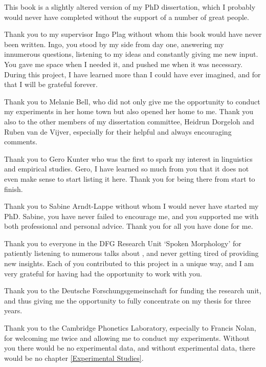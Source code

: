 \addchap{\lsAcknowledgementTitle} 

\vspace*{-0.4cm}
This book is a slightly altered version of my PhD dissertation, which I probably would never have completed without the support of a number of great people.

Thank you to my supervisor Ingo Plag without whom this book would have never been written. Ingo, you stood by my side from day one, answering my innumerous questions,  listening to my ideas and constantly giving me new input. You gave me space when I needed it, and pushed me when it was necessary. During this project, I have learned more than I could have ever imagined, and for that I will be grateful forever.

Thank you to Melanie Bell, who did not only give me the opportunity to conduct my experiments in her home town but also opened her home to me. 
Thank you also to the other members of my dissertation committee, Heidrun Dorgeloh and Ruben van de Vijver, especially for their helpful and always encouraging comments. 

Thank you to Gero Kunter who was the first to spark my interest in linguistics and empirical studies. Gero, I have learned so much from you that it does not even make sense to start listing it here. Thank you for being there from start to finish.

Thank you to Sabine Arndt-Lappe without whom I would never have started my PhD. Sabine, you have never failed to encourage me, and you supported me with both professional and personal advice. Thank you for all you have done for me.

Thank you to everyone in the DFG Research Unit `Spoken Morphology' for patiently listening to numerous talks about , and never getting tired of providing new insights. Each of you contributed to this project in a unique way, and I am very grateful for having had the opportunity to work with you.

Thank you to the Deutsche Forschungsgemeinschaft for funding the research unit, and thus giving me the opportunity to fully concentrate on my thesis for three years.

Thank you to the Cambridge Phonetics Laboratory, especially to Francis Nolan, for welcoming me twice and allowing me to conduct my experiments. Without you there would be no experimental data, and without experimental data, there would be no chapter \ref{Experimental Studies}.


